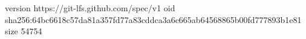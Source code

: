 version https://git-lfs.github.com/spec/v1
oid sha256:64bc6618c57da81a357fd77a83cddca3a6c665ab64568865b00fd777893b1e81
size 54754
